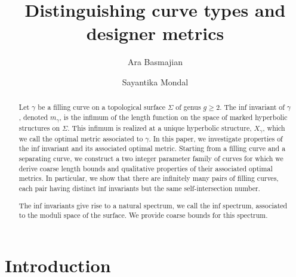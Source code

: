 \documentclass[12pt]{amsart}
\title{Distinguishing curve types and designer metrics}
\author{Ara Basmajian}
\author{Sayantika Mondal}
\numberwithin{equation}{section}
\theoremstyle{plain}
\begin{document}
\begin{abstract}
Let $\gamma$ be a filling curve on a topological surface $\Sigma$  of genus $g \geq 2$. The inf invariant of $\gamma$, denoted $m_{\gamma}$,  is the infimum of the length function on the space of marked hyperbolic structures on $\Sigma$. This infimum is realized at a unique hyperbolic structure,  $X_{\gamma}$, which we call the optimal metric associated to $\gamma$. In this paper, we investigate properties of the inf invariant and its associated optimal metric. Starting from a filling curve and a separating curve, we construct a two integer parameter family of curves for which we derive coarse length bounds and qualitative properties of their associated optimal metrics. In particular, we show that there are infinitely many pairs of filling curves, each pair having distinct $\text{inf}$ invariants but the same self-intersection number. 



The inf invariants give rise to a natural spectrum, we call the 
inf spectrum, associated to  the moduli space of the surface. We provide coarse bounds for this spectrum.
 


\end{abstract}


\maketitle


\section{Introduction}
\label{sec: intoduction}
\end{document}
